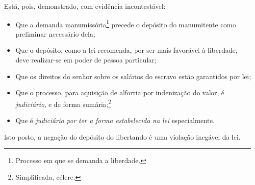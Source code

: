Está, pois, demonstrado, com evidência incontestável:

\begin{itemize}
\item Que a demanda
manumissória\footnote{Processo em que se demanda a liberdade.} precede
o depósito do manumitente como preliminar necessário dela;

\item Que o depósito, como a lei recomenda, por ser mais favorável à
liberdade, deve realizar-se em poder de pessoa particular;

\item Que os direitos do senhor sobre os salários do escravo estão garantidos
por lei;

\item Que o processo, para aquisição de alforria por indenização do valor, é
\emph{judiciário}, e de forma sumária;\footnote{Simplificada, célere.}

\item Que é \emph{judiciário por ter a forma estabelecida na lei}
especialmente.

\end{itemize}
Isto posto, a negação do depósito do libertando é uma violação inegável da lei.

